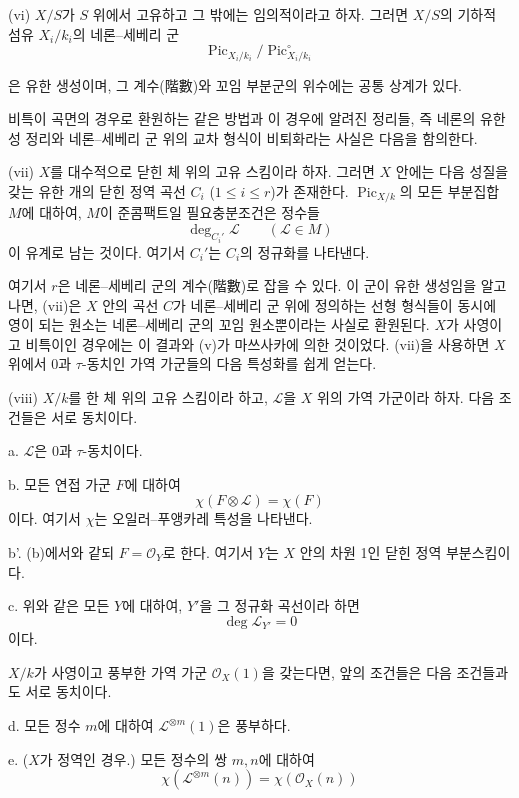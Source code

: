 \documentclass[11pt,twoside,openany]{book}
\numberwithin{equation}{section}
\newcommand{\sourceunit}{front}
\newcommand{\src}[1]{%
  \phantomsection\hypertarget{src:\sourceunit:#1}{}%
  \marginpar{\raggedleft\footnotesize\sffamily #1}%
}
\theoremstyle{plain}
\theoremstyle{definition}
\theoremstyle{remark}
\begin{document}
\medskip
\noindent(vi) $X/S$가 $S$ 위에서 고유하고 그 밖에는 임의적이라고 하자.
그러면 $X/S$의 기하적 섬유 $X_i/k_i$의 네론--세베리 군
\[
\operatorname{Pic}_{X_i/k_i}/\operatorname{Pic}_{X_i/k_i}^\circ
\]

\src{305}
은 유한 생성이며, 그 계수(階數)와 꼬임 부분군의 위수에는 공통 상계가
있다.

비특이 곡면의 경우로 환원하는 같은 방법과 이 경우에 알려진 정리들, 즉
네론의 유한성 정리와 네론--세베리 군 위의 교차 형식이 비퇴화라는 사실은
다음을 함의한다.

\medskip
\noindent(vii) $X$를 대수적으로 닫힌 체 위의 고유 스킴이라 하자.
그러면 $X$ 안에는 다음 성질을 갖는 유한 개의 닫힌 정역 곡선
$C_i$ ($1\leq i\leq r$)가 존재한다. $\operatorname{Pic}_{X/k}$의
모든 부분집합 $M$에 대하여, $M$이 준콤팩트일 필요충분조건은 정수들
\[
\deg_{C_i'}\mathcal L\qquad(\mathcal L\in M)
\]
이 유계로 남는 것이다. 여기서 $C_i'$는 $C_i$의 정규화를 나타낸다.

여기서 $r$은 네론--세베리 군의 계수(階數)로 잡을 수 있다. 이 군이 유한
생성임을 알고 나면, (vii)은 $X$ 안의 곡선 $C$가 네론--세베리 군 위에
정의하는 선형 형식들이 동시에 영이 되는 원소는 네론--세베리 군의 꼬임
원소뿐이라는 사실로 환원된다. $X$가 사영이고 비특이인 경우에는 이 결과와
(v)가 마쓰사카에 의한 것이었다. (vii)을 사용하면 $X$ 위에서 $0$과
$\tau$-동치인 가역 가군들의 다음 특성화를 쉽게 얻는다.

\medskip
\noindent(viii) $X/k$를 한 체 위의 고유 스킴이라 하고, $\mathcal L$을
$X$ 위의 가역 가군이라 하자. 다음 조건들은 서로 동치이다.

\noindent a. $\mathcal L$은 $0$과 $\tau$-동치이다.

\noindent b. 모든 연접 가군 $F$에 대하여
\[
\chi(F\otimes\mathcal L)=\chi(F)
\]
이다. 여기서 $\chi$는 오일러--푸앵카레 특성을 나타낸다.

\noindent b'. (b)에서와 같되 $F=\mathcal O_Y$로 한다. 여기서 $Y$는
$X$ 안의 차원 1인 닫힌 정역 부분스킴이다.

\noindent c. 위와 같은 모든 $Y$에 대하여, $Y'$을 그 정규화 곡선이라
하면
\[
\deg\mathcal L_{Y'}=0
\]
이다.

$X/k$가 사영이고 풍부한 가역 가군 $\mathcal O_X(1)$을 갖는다면, 앞의
조건들은 다음 조건들과도 서로 동치이다.

\noindent d. 모든 정수 $m$에 대하여 $\mathcal L^{\otimes m}(1)$은
풍부하다.

\noindent e. ($X$가 정역인 경우.) 모든 정수의 쌍 $m,n$에 대하여
\[
\chi(\mathcal L^{\otimes m}(n))=\chi(\mathcal O_X(n))
\]
\end{document}
